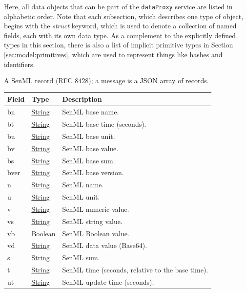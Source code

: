 \documentclass[a4paper]{arrowhead}
\newcommand{\pref}[1]{{\textcolor{ArrowheadGrey}{\hyperref[sec:model:primitives:#1]{#1}}}}
\begin{document}
Here, all data objects that can be part of the \texttt{dataProxy} service are listed in alphabetic order.
Note that each subsection, which describes one type of object, begins with the \textit{struct} keyword, which is used to denote a collection of named fields, each with its own data type.
As a complement to the explicitly defined types in this section, there is also a list of implicit primitive types in Section \ref{sec:model:primitives}, which are used to represent things like hashes and identifiers.


A SenML record (RFC 8428); a message is a JSON array of records.


\noindent\begin{tabularx}{\textwidth}{| >{\raggedright\arraybackslash}p{3.9cm} | >{\raggedright\arraybackslash\small}p{5.3cm} | X |} \hline
\rowcolor{gray!33} Field & Type & Description \\ \hline
bn & \pref{String} & SenML base name. \\ \hline
bt & \pref{String} & SenML base time (seconds). \\ \hline
bu & \pref{String} & SenML base unit. \\ \hline
bv & \pref{String} & SenML base value. \\ \hline
bs & \pref{String} & SenML base sum. \\ \hline
bver & \pref{String} & SenML base version. \\ \hline
n & \pref{String} & SenML name. \\ \hline
u & \pref{String} & SenML unit. \\ \hline
v & \pref{String} & SenML numeric value. \\ \hline
vs & \pref{String} & SenML string value. \\ \hline
vb & \pref{Boolean} & SenML Boolean value. \\ \hline
vd & \pref{String} & SenML data value (Base64). \\ \hline
s & \pref{String} & SenML sum. \\ \hline
t & \pref{String} & SenML time (seconds, relative to the base time). \\ \hline
ut & \pref{String} & SenML update time (seconds). \\ \hline
\end{tabularx}



\end{document}
